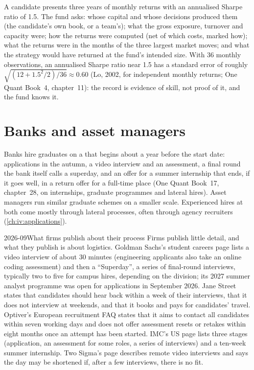 \begin{example}\label{ex:iv:the-process-by-firm-type:record}
A candidate presents three years of monthly returns with an annualised Sharpe ratio of 1.5. The fund asks:
whose capital and whose decisions produced them (the candidate's own book, or a team's); what the gross
exposure, turnover and capacity were; how the returns were computed (net of which costs, marked how); what the
returns were in the months of the three largest market moves; and what the strategy would have returned at the
fund's intended size. With 36 monthly observations, an annualised Sharpe ratio near 1.5 has a standard error
of roughly $\sqrt{(12 + 1.5^2/2)/36} \approx 0.60$ (Lo, 2002, for independent monthly returns; One Quant Book~4, chapter~11): the record is evidence of
skill, not proof of it, and the fund knows it.
\end{example}

\section{Banks and asset managers}

Banks hire graduates on a  that begins about a year before the start date: applications in
the autumn, a video interview and an assessment, a final round the bank itself calls a superday, and an offer
for a summer internship that ends, if it goes well, in a return offer for a full-time place (One Quant
Book~17, chapter~28, on internships, graduate programmes and lateral hires). Asset managers run similar
graduate schemes on a smaller scale. Experienced hires at both come mostly through lateral processes, often
through agency recruiters (\cref{ch:iv:applications}).

\begin{dated}{2026-09}{What firms publish about their process}\label{dat:iv:the-process-by-firm-type:published}
Firms publish little detail, and what they publish is about logistics. Goldman Sachs's student careers page
lists a video interview of about 30 minutes (engineering applicants also take an online coding assessment)
and then a ``Superday'', a series of final-round interviews, typically two to five for campus hires,
depending on the division; its 2027 summer analyst programme was open for applications in September 2026.
Jane Street states that candidates should hear back within a week of their interviews, that it does not
interview at weekends, and that it books and pays for candidates' travel. Optiver's European recruitment FAQ
states that it aims to contact all candidates within seven working days and does not offer assessment resets
or retakes within eight months once an attempt has been started. IMC's US page lists three stages
(application, an assessment for some roles, a series of interviews) and a ten-week summer internship. Two
Sigma's page describes remote video interviews and says the day may be shortened if, after a few interviews,
there is no fit.
\end{dated}

